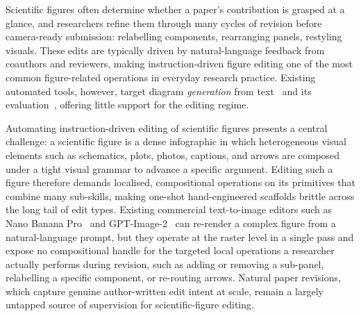 \documentclass[11pt]{article}
\begin{document}
Scientific figures often determine whether a paper's contribution
is grasped at a glance, and researchers refine them through many
cycles of revision before camera-ready submission: relabelling
components, rearranging panels, restyling visuals.  These edits
are typically driven by natural-language feedback from coauthors
and reviewers, making instruction-driven figure editing one of the
most common figure-related operations in everyday research
practice.  Existing automated tools, however, target diagram \emph{generation}
from text~\citep{zhu2026autofigure, zhu2026paperbanana,
huang2026scifig} and its
evaluation~\citep{liao2026aibench, chang2025sridbench}, offering
little support for the editing regime.

Automating instruction-driven editing of scientific figures
presents a central challenge: a scientific figure is a dense
infographic in which heterogeneous visual elements such as
schematics, plots, photos, captions, and arrows are composed under
a tight visual grammar to advance a specific argument.  Editing such a figure therefore demands localised,
compositional operations on its primitives that combine many
sub-skills, making one-shot hand-engineered scaffolds brittle
across the long tail of edit types.
Existing commercial text-to-image editors such as Nano
Banana Pro~\citep{google2025nanobanana} and
GPT-Image-2~\citep{openai2025gptimage} can re-render a complex
figure from a natural-language prompt, but they operate at the
raster level in a single pass and expose no compositional handle
for the targeted local operations a researcher actually performs
during revision, such as adding or removing a sub-panel,
relabelling a specific component, or re-routing arrows.  Natural
paper revisions, which capture genuine author-written edit intent
at scale, remain a largely untapped source of supervision for
scientific-figure editing.
\end{document}
